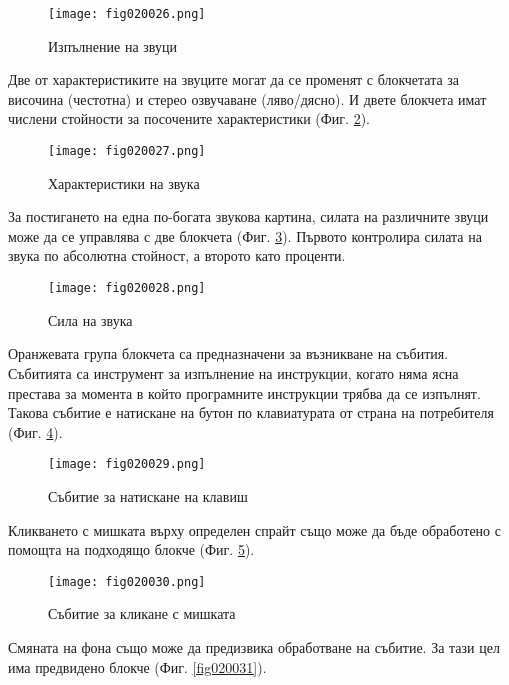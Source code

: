 \begin{figure}[H]
  \centering
  \texttt{[image: fig020026.png]}
  \caption{Изпълнение на звуци}
\label{fig020026}
\end{figure}

Две от характеристиките на звуците могат да се променят с блокчетата за височина (честотна) и стерео озвучаване (ляво/дясно). И двете блокчета имат числени стойности за посочените характеристики (Фиг. \ref{fig020027}).

\begin{figure}[H]
  \centering
  \texttt{[image: fig020027.png]}
  \caption{Характеристики на звука}
\label{fig020027}
\end{figure}

За постигането на една по-богата звукова картина, силата на различните звуци може да се управлява с две блокчета (Фиг. \ref{fig020028}). Първото контролира силата на звука по абсолютна стойност, а второто като проценти. 

\begin{figure}[H]
  \centering
  \texttt{[image: fig020028.png]}
  \caption{Сила на звука}
\label{fig020028}
\end{figure}

Оранжевата група блокчета са предназначени за възникване на събития. Събитията са инструмент за изпълнение на инструкции, когато няма ясна престава за момента в който програмните инструкции трябва да се изпълнят. Такова събитие е натискане на бутон по клавиатурата от страна на потребителя (Фиг. \ref{fig020029}).

\begin{figure}[H]
  \centering
  \texttt{[image: fig020029.png]}
  \caption{Събитие за натискане на клавиш}
\label{fig020029}
\end{figure}

Кликването с мишката върху определен спрайт също може да бъде обработено с помощта на подходящо блокче (Фиг. \ref{fig020030}).

\begin{figure}[H]
  \centering
  \texttt{[image: fig020030.png]}
  \caption{Събитие за кликане с мишката}
\label{fig020030}
\end{figure}

Смяната на фона също може да предизвика обработване на събитие. За тази цел има предвидено блокче (Фиг. \ref{fig020031}).

